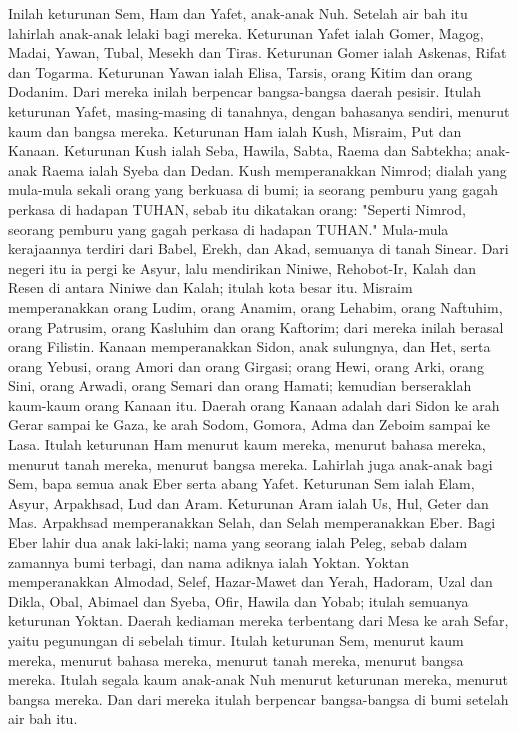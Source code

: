\begin{biblechapter} %
 Inilah keturunan Sem, Ham dan Yafet, anak-anak Nuh. Setelah air bah itu lahirlah anak-anak lelaki bagi mereka.
\verse Keturunan Yafet ialah Gomer, Magog, Madai, Yawan, Tubal, Mesekh dan Tiras.
\verse Keturunan Gomer ialah Askenas, Rifat dan Togarma.
\verse Keturunan Yawan ialah Elisa, Tarsis, orang Kitim dan orang Dodanim.
\verse Dari mereka inilah berpencar bangsa-bangsa daerah pesisir. Itulah keturunan Yafet, masing-masing di tanahnya, dengan bahasanya sendiri, menurut kaum dan bangsa mereka.
\verse Keturunan Ham ialah Kush, Misraim, Put dan Kanaan.
\verse Keturunan Kush ialah Seba, Hawila, Sabta, Raema dan Sabtekha; anak-anak Raema ialah Syeba dan Dedan.
\verse Kush memperanakkan Nimrod; dialah yang mula-mula sekali orang yang berkuasa di bumi;
\verse ia seorang pemburu yang gagah perkasa di hadapan TUHAN, sebab itu dikatakan orang: "Seperti Nimrod, seorang pemburu yang gagah perkasa di hadapan TUHAN."
\verse Mula-mula kerajaannya terdiri dari Babel, Erekh, dan Akad, semuanya di tanah Sinear.
\verse Dari negeri itu ia pergi ke Asyur, lalu mendirikan Niniwe, Rehobot-Ir, Kalah
\verse dan Resen di antara Niniwe dan Kalah; itulah kota besar itu.
\verse Misraim memperanakkan orang Ludim, orang Anamim, orang Lehabim, orang Naftuhim,
\verse orang Patrusim, orang Kasluhim dan orang Kaftorim; dari mereka inilah berasal orang Filistin.
\verse Kanaan memperanakkan Sidon, anak sulungnya, dan Het,
\verse serta orang Yebusi, orang Amori dan orang Girgasi;
\verse orang Hewi, orang Arki, orang Sini,
\verse orang Arwadi, orang Semari dan orang Hamati; kemudian berseraklah kaum-kaum orang Kanaan itu.
\verse Daerah orang Kanaan adalah dari Sidon ke arah Gerar sampai ke Gaza, ke arah Sodom, Gomora, Adma dan Zeboim sampai ke Lasa.
\verse Itulah keturunan Ham menurut kaum mereka, menurut bahasa mereka, menurut tanah mereka, menurut bangsa mereka.
\verse Lahirlah juga anak-anak bagi Sem, bapa semua anak Eber serta abang Yafet.
\verse Keturunan Sem ialah Elam, Asyur, Arpakhsad, Lud dan Aram.
\verse Keturunan Aram ialah Us, Hul, Geter dan Mas.
\verse Arpakhsad memperanakkan Selah, dan Selah memperanakkan Eber.
\verse Bagi Eber lahir dua anak laki-laki; nama yang seorang ialah Peleg, sebab dalam zamannya bumi terbagi, dan nama adiknya ialah Yoktan.
\verse Yoktan memperanakkan Almodad, Selef, Hazar-Mawet dan Yerah,
\verse Hadoram, Uzal dan Dikla,
\verse Obal, Abimael dan Syeba,
\verse Ofir, Hawila dan Yobab; itulah semuanya keturunan Yoktan.
\verse Daerah kediaman mereka terbentang dari Mesa ke arah Sefar, yaitu pegunungan di sebelah timur.
\verse Itulah keturunan Sem, menurut kaum mereka, menurut bahasa mereka, menurut tanah mereka, menurut bangsa mereka.
\verse Itulah segala kaum anak-anak Nuh menurut keturunan mereka, menurut bangsa mereka. Dan dari mereka itulah berpencar bangsa-bangsa di bumi setelah air bah itu.
\end{biblechapter}

